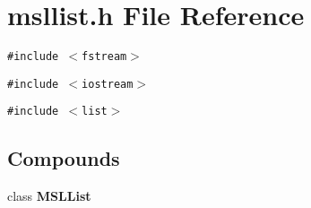 \section{msllist.h File Reference}
\label{msllist_8h}
{\tt \#include $<$fstream$>$}\par
{\tt \#include $<$iostream$>$}\par
{\tt \#include $<$list$>$}\par
\subsection*{Compounds}
\begin{CompactItemize}
\item 
class {\bf MSLList}
\end{CompactItemize}
